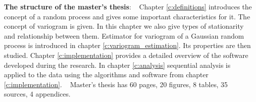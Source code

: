 \textbf{The structure of the master's thesis}:
 
Chapter \ref{c:definitions} introduces the concept of a random process and gives some important characteristics for it. The concept of variogram is given. In this chapter we also give types of stationarity and relationship between them. Estimator for variogram of a Gaussian random process is introduced in chapter \ref{c:variogram_estimation}. Its properties are then studied. Chapter \ref{c:implementation} provides a detailed overview of the software developed during the research. In chapter \ref{c:analysis} sequential analysis is applied to the data using the algorithms and software from chapter \ref{c:implementation}.
 
Master's thesis has 60 pages, 20 figures, 8 tables, 35 sources, 4 appendices.
